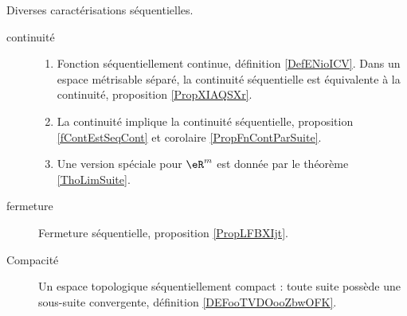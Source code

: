
Diverses caractérisations séquentielles.
\begin{description}
    \item[continuité]
        \begin{enumerate}
	\item
        Fonction séquentiellement continue, définition \ref{DefENioICV}. Dans un espace métrisable séparé, la continuité séquentielle est équivalente à la continuité, proposition \ref{PropXIAQSXr}.
	\item
	      La continuité implique la continuité séquentielle, proposition \ref{fContEstSeqCont} et corolaire \ref{PropFnContParSuite}.
	\item
	      Une version spéciale pour \( \eR^m\) est donnée par le théorème \ref{ThoLimSuite}.
        \end{enumerate}
    \item[fermeture]
          Fermeture séquentielle, proposition \ref{PropLFBXIjt}.
      \item[Compacité]
          Un espace topologique séquentiellement compact : toute suite possède une sous-suite convergente, définition \ref{DEFooTVDOooZbwOFK}.
\end{description}


